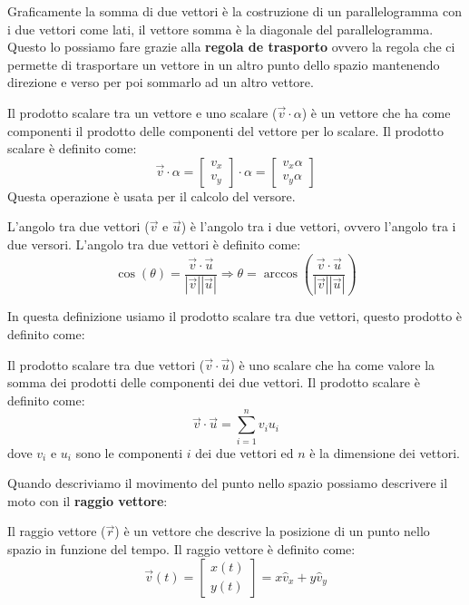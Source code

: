         Graficamente la somma di due vettori è la costruzione di un parallelogramma con i due vettori come lati, il vettore somma è la diagonale del parallelogramma. Questo lo possiamo fare grazie alla \textbf{regola de trasporto} ovvero la regola che ci permette di trasportare un vettore in un altro punto dello spazio mantenendo direzione e verso per poi sommarlo ad un altro vettore.
        \begin{definition}
            Il prodotto scalare tra un vettore e uno scalare ($\vec{v}\cdot\alpha$) è un vettore che ha come componenti il prodotto delle componenti del vettore per lo scalare. Il prodotto scalare è definito come:
            $$
                \vec{v}\cdot\alpha = \begin{bmatrix} v_x\\ v_y \end{bmatrix}\cdot\alpha = \begin{bmatrix} v_x\alpha\\ v_y\alpha \end{bmatrix}
            $$
            Questa operazione è usata per il calcolo del versore.
        \end{definition}
        \begin{definition}
            L'angolo tra due vettori ($\vec{v}$ e $\vec{u}$) è l'angolo tra i due vettori, ovvero l'angolo tra i due versori. L'angolo tra due vettori è definito come:
            $$
                \cos(\theta) = \frac{\vec{v}\cdot\vec{u}}{\left|\vec{v}\right|\left|\vec{u}\right|} \Rightarrow \theta = \arccos\left(\frac{\vec{v}\cdot\vec{u}}{\left|\vec{v}\right|\left|\vec{u}\right|}\right)
            $$
        \end{definition}
        In questa definizione usiamo il prodotto scalare tra due vettori, questo prodotto è definito come:
        \begin{definition}
            Il prodotto scalare tra due vettori ($\vec{v}\cdot\vec{u}$) è uno scalare che ha come valore la somma dei prodotti delle componenti dei due vettori. Il prodotto scalare è definito come:
            $$
                \vec{v}\cdot\vec{u} = \sum_{i=1}^n v_iu_i
            $$
            dove $v_i$ e $u_i$ sono le componenti $i$ dei due vettori ed $n$ è la dimensione dei vettori.
        \end{definition}
        Quando descriviamo il movimento del punto nello spazio possiamo descrivere il moto con il \textbf{raggio vettore}:
        \begin{definition}
            Il raggio vettore ($\vec{r}$) è un vettore che descrive la posizione di un punto nello spazio in funzione del tempo. Il raggio vettore è definito come:
            $$
                \vec{v}(t) = \begin{bmatrix} x(t)\\ y(t) \end{bmatrix}=x\hat{v}_x+y\hat{v}_y
            $$
        \end{definition}
